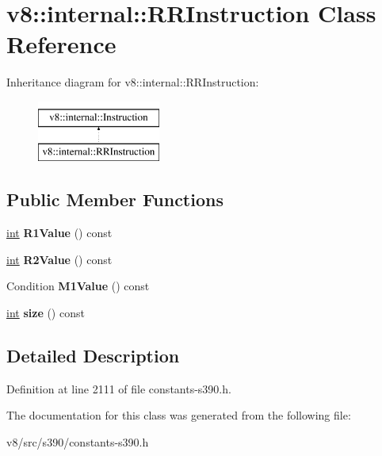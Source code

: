 \hypertarget{classv8_1_1internal_1_1RRInstruction}{}\section{v8\+:\+:internal\+:\+:R\+R\+Instruction Class Reference}
\label{classv8_1_1internal_1_1RRInstruction}
Inheritance diagram for v8\+:\+:internal\+:\+:R\+R\+Instruction\+:\begin{figure}[H]
\begin{center}
\leavevmode
\includegraphics[height=2.000000cm]{classv8_1_1internal_1_1RRInstruction}
\end{center}
\end{figure}
\subsection*{Public Member Functions}
\begin{DoxyCompactItemize}
\item 
\mbox{\label{classv8_1_1internal_1_1RRInstruction_a85e41d8d94f28091ef63309ce132fe1f}} 
\mbox{\hyperlink{classint}{int}} {\bfseries R1\+Value} () const
\item 
\mbox{\label{classv8_1_1internal_1_1RRInstruction_ade3ca78ac905b4068ff5058070bd06ba}} 
\mbox{\hyperlink{classint}{int}} {\bfseries R2\+Value} () const
\item 
\mbox{\label{classv8_1_1internal_1_1RRInstruction_a6ca00d920e8a0c1210450f39735a001d}} 
Condition {\bfseries M1\+Value} () const
\item 
\mbox{\label{classv8_1_1internal_1_1RRInstruction_ae82acdf716b315186078f7bcf3557c0a}} 
\mbox{\hyperlink{classint}{int}} {\bfseries size} () const
\end{DoxyCompactItemize}


\subsection{Detailed Description}


Definition at line 2111 of file constants-\/s390.\+h.



The documentation for this class was generated from the following file\+:\begin{DoxyCompactItemize}
\item 
v8/src/s390/constants-\/s390.\+h\end{DoxyCompactItemize}
